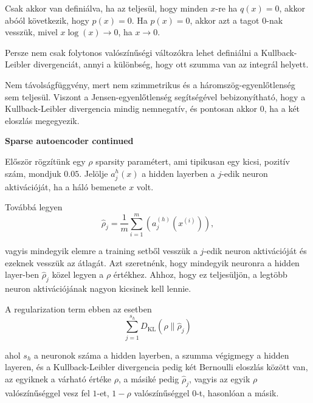 \documentclass[12pt]{amsart}
\begin{document}
\vspace{5pt}

Csak akkor van definiálva, ha az teljesül, hogy minden
$x$-re ha $q(x)=0$, akkor abóól következik, hogy
$p(x)=0$. Ha $p(x)=0$, akkor azt a tagot $0$-nak vesszük,
mivel $x\log(x)\to 0$, ha $x\to 0$.

\vspace{5pt}

Persze nem csak folytonos valószínűségi változókra lehet
definiálni a Kullback-Leibler divergenciát, annyi a
különbség, hogy ott szumma van az integrál helyett.
\vspace{5pt}

Nem távolságfüggvény, mert nem szimmetrikus és a
háromszög-egyenlőtlenség sem teljesül. Viszont a
Jensen-egyenlőtlenség segítségével bebizonyítható, hogy a
Kullback-Leibler divergencia mindig nemnegatív, és pontosan
akkor $0$, ha a két eloszlás megegyezik.

\vspace{10pt}

\textbf{Sparse autoencoder continued}

\vspace{10pt}

Először rögzítünk egy $\rho$ sparsity paramétert, ami
tipikusan egy kicsi, pozitív szám, mondjuk $0.05$. Jelölje
$a_j^{h}(x)$ a hidden layerben a $j$-edik neuron aktivációját,
ha a háló bemenete $x$ volt.

\vspace{5pt}

Továbbá legyen
\[
  \hat{\rho}_j= \frac{1}{m}\sum_{i=1}^m (a_j^{(h)}(x^{(i)})),
\]

\vspace{5pt}

vagyis mindegyik elemre a training setből vesszük a $j$-edik
neuron aktivációját és ezeknek vesszük az átlagát. Azt
szeretnénk, hogy mindegyik neuronra a hidden layer-ben
$\hat{\rho}_j$ közel legyen a $\rho$ értékhez. Ahhoz, hogy
ez teljesüljön, a legtöbb neuron aktivációjának nagyon
kicsinek kell lennie. 

\vspace{5pt}

A regularization term ebben az esetben
\[
  \sum_{j=1}^{s_h} D_{\text{KL}}(\rho \| \hat{\rho}_j)
\]

\vspace{5pt}

ahol $s_h$ a neuronok száma a hidden layerben, a szumma
végigmegy a hidden layeren, és a Kullback-Leibler
divergencia pedig két Bernoulli eloszlás között van, az
egyiknek a várható értéke $\rho$, a másiké pedig
$\hat{\rho}_j$, vagyis az egyik $\rho$ valószínűséggel vesz
fel $1$-et, $1-\rho$ valószínűséggel $0$-t, hasonlóan a
másik. 
\end{document}
